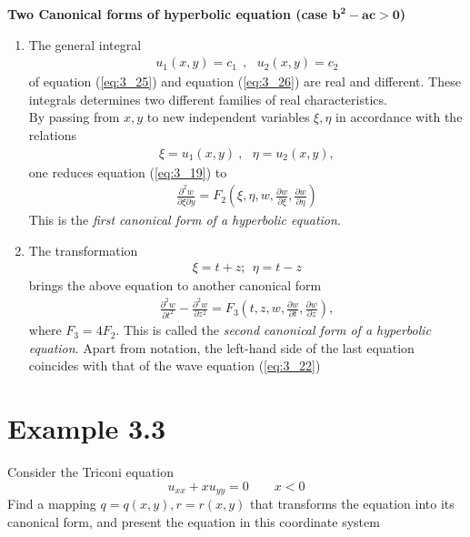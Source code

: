 \documentclass[11pt]{report}
\newcommand{\NI}{\noindent}
\newcommand{\refn}[1]{(\ref{#1})}
\newcommand{\refx}[1]{\refn{eq:#1}}
\newcommand{\bt}[1]{\textbf{#1}}
\begin{document}
	\NI\bt{Two Canonical forms of hyperbolic equation (case $\mathbf{b^2-ac>0}$)}
	\begin{enumerate}
		\item The general integral
		\begin{eqnarray*}
			u_1(x,y)=c_1 ~~, ~~~ u_2(x,y)=c_2
		\end{eqnarray*}
		of equation \refx{3_25} and equation \refx{3_26} are real and different. These integrals determines two different families of real characteristics.\\
		By passing from $x,y$ to new independent variables $\xi, \eta$ in accordance with the relations
		\begin{eqnarray*}
			\xi=u_1(x,y)~, ~~~ \eta = u_2(x,y),
		\end{eqnarray*}
		one reduces equation \refx{3_19} to
		\begin{eqnarray*}
			\frac{\partial^2 w}{\partial\xi\partial y} = F_2\left(\xi,\eta,w,\frac{\partial w}{\partial\xi},\frac{\partial w}{\partial\eta}\right)
		\end{eqnarray*}
		This is the \textit{first canonical form of a hyperbolic equation}.
		\item The transformation
		\begin{eqnarray*}
			\xi = t + z;~~ \eta = t-z
		\end{eqnarray*}
		brings the above equation to another canonical form
		\begin{eqnarray*}
			\frac{\partial^2 w}{\partial t^2} - \frac{\partial^2 w}{\partial z^2} = F_3\left(t,z,w,\frac{\partial w}{\partial t}, \frac{\partial w}{\partial z}\right),
		\end{eqnarray*}
		where $F_3=4F_2$. This is called the \textit{second canonical form of a hyperbolic equation}. Apart from notation, the left-hand side of the last equation coincides with that of the wave equation \refx{3_22}
	\end{enumerate}
	
	\section*{Example 3.3}
	Consider the Triconi equation
	\begin{equation*}
		u_{xx} + xu_{yy} = 0 \qquad x < 0 \label{ex:3_3_1}
	\end{equation*}
	Find a mapping $q=q(x,y), r=r(x,y)$ that transforms the equation into its canonical form, and present the equation in this coordinate system
	
\end{document}
